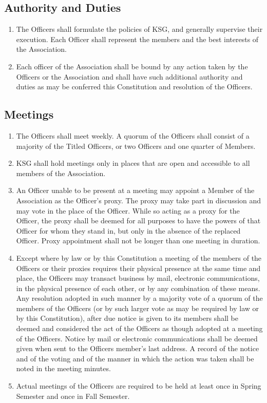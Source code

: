 \documentclass[12pt,letterpaper]{article}
\begin{document}
\subsection{Authority and Duties}
\begin{enumerate}
  \item The Officers shall formulate the policies of KSG, and generally supervise
        their execution. Each Officer shall represent the members and the best
        interests of the Association.
  \item Each officer of the Association shall be bound by any action taken by the
        Officers or the Association and shall have such additional authority and
        duties as may be conferred this Constitution and resolution of the Officers.
\end{enumerate}

\subsection{Meetings}
\begin{enumerate}
  \item The Officers shall meet weekly. A quorum of the Officers shall consist of a
        majority of the Titled Officers, or two Officers and one quarter of Members.
  \item KSG shall hold meetings only in places that are open and accessible
        to all members of the Association.
  \item An Officer unable to be present at a meeting may appoint a Member of the
        Association as the Officer's proxy. The proxy may take part in discussion and
        may vote in the place of the Officer. While so acting as a proxy for the
        Officer, the proxy shall be deemed for all purposes to have the powers of
        that Officer for whom they stand in, but only in the absence of the replaced
        Officer. Proxy appointment shall not be longer than one meeting in duration.
  \item Except where by law or by this Constitution a meeting of the members of the
        Officers or their proxies requires their physical presence at the same time
        and place, the Officers may transact business by mail, electronic
        communications, in the physical presence of each other, or by any combination
        of these means. Any resolution adopted in such manner by a majority vote of a
        quorum of the members of the Officers (or by such larger vote as may be
        required by law or by this Constitution), after due notice is
        given to its members shall be deemed and considered the act of the Officers
        as though adopted at a meeting of the Officers. Notice by mail or electronic
        communications shall be deemed given when sent to the Officers member's last
        address. A record of the notice and of the voting and of the manner in which
        the action was taken shall be noted in the meeting minutes.
  \item Actual meetings of the Officers are required to be held at least once in
        Spring Semester and once in Fall Semester.
\end{enumerate}
\end{document}
